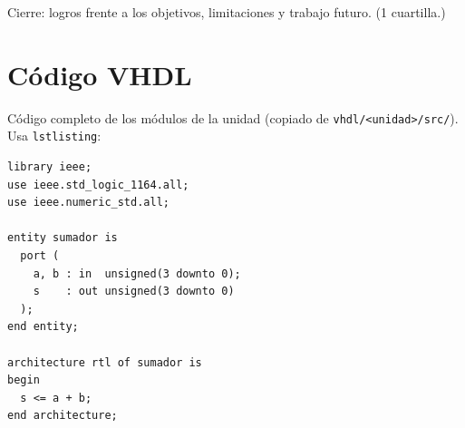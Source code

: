 \documentclass[llncs]{llncs}
\begin{document}
Cierre: logros frente a los objetivos, limitaciones y trabajo futuro.
(1 cuartilla.)




\appendix
\section{Código VHDL}
\label{app:codigo}

Código completo de los módulos de la unidad (copiado de
\texttt{vhdl/<unidad>/src/}). Usa \texttt{lstlisting}:

\begin{lstlisting}[caption={sumador.vhd --- <descripción>}, label=lst:sumador]
library ieee;
use ieee.std_logic_1164.all;
use ieee.numeric_std.all;

entity sumador is
  port (
    a, b : in  unsigned(3 downto 0);
    s    : out unsigned(3 downto 0)
  );
end entity;

architecture rtl of sumador is
begin
  s <= a + b;
end architecture;
\end{lstlisting}
\end{document}
